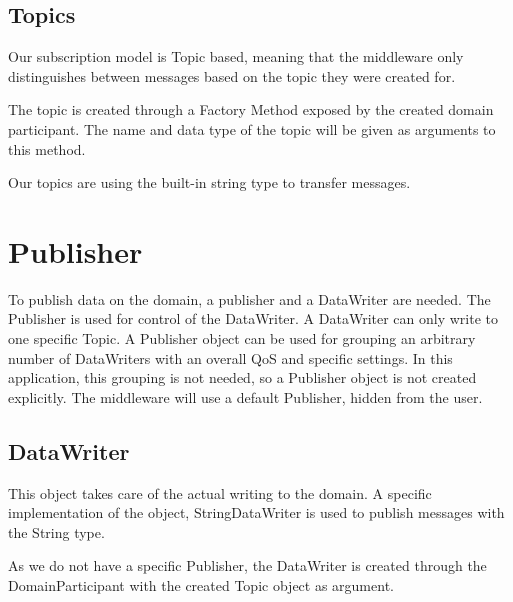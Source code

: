 \begin{center}
\end{center}

\subsection{Topics}
Our subscription model is Topic based, meaning that the middleware only distinguishes between messages based on the topic they were created for. 

The topic is created through a Factory Method exposed by the created domain participant. The name and data type of the topic will be given as arguments to this method. 

Our topics are using the built-in string type to transfer messages.

\begin{center}
\end{center}

\section{Publisher}
To publish data on the domain, a publisher and a DataWriter are needed. The Publisher is used for control of the DataWriter. 
A DataWriter can only write to one specific Topic. A Publisher object can be used for grouping an arbitrary number of DataWriters with an overall QoS and specific settings.
In this application, this grouping is not needed, so a Publisher object is not created explicitly. The middleware will use a default Publisher, hidden from the user.

\subsection{DataWriter}
This object takes care of the actual writing to the domain. A specific implementation of the object, StringDataWriter is used to publish messages with the String type. 

As we do not have a specific Publisher, the DataWriter is created through the DomainParticipant with the created Topic object as argument.

\begin{center}
\end{center}

